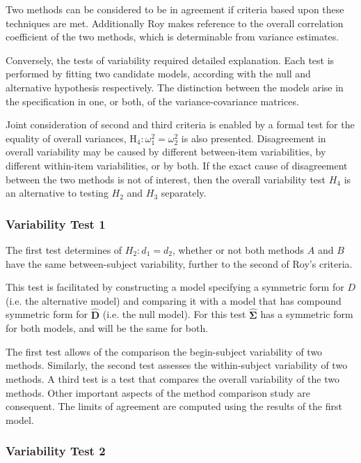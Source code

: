 \documentclass[12pt, a4paper]{report}
\theoremstyle{plain}
\theoremstyle{definition}
\theoremstyle{remark}
\begin{document}
Two methods can be considered to be in agreement if criteria based upon these techniques are met. Additionally Roy makes reference to the overall correlation coefficient of the two methods, which is determinable from variance estimates.

Conversely, the tests of variability required detailed explanation. Each test is performed by fitting two candidate models, according with the null and alternative hypothesis respectively. The distinction between the models arise in the specification in one, or both, of the variance-covariance matrices. %

Joint consideration of second and third criteria is enabled by a formal test for the equality of overall variances, $\operatorname{H_4} : \omega^2_1 = \omega^2_2$ is also presented. Disagreement in overall variability may be caused by different between-item variabilities, by different within-item variabilities, or by both.  If the exact cause of disagreement between the two methods is not of interest, then the overall variability test $H_4$ is an alternative to testing $H_2$ and $H_3$ separately.


\subsubsection{Variability Test 1}
The first test determines of $H_{2}: d_{1}  = d_{2}$, whether or not both methods $A$ and $B$ have the same between-subject variability, further to the second of Roy's criteria.

This test is facilitated by constructing a model specifying a symmetric form for $D$ (i.e. the alternative model) and comparing it with a model that has compound symmetric form for $\boldsymbol{\hat{D}}$ (i.e. the null model). For this test $\boldsymbol{\hat{\Sigma}}$ has a symmetric form for both models, and will be the same for both.

The first test allows of the comparison the begin-subject variability of two methods. Similarly, the second test assesses the within-subject variability of two methods. A third test is a test that compares the overall variability of the two methods. Other important aspects of the method comparison study are consequent. The limits of agreement are computed using the results of the first model.

\subsubsection{Variability Test 2}
\end{document}
